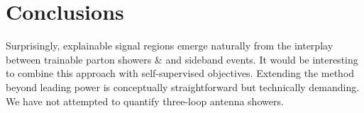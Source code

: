 \section{Conclusions}\label{sec:conclusions}

Surprisingly, explainable signal regions emerge naturally from the
interplay between trainable parton showers & and sideband events. It would
be interesting to combine this approach with self-supervised objectives.
Extending the method beyond leading power is conceptually
straightforward but technically demanding. We have not attempted to
quantify three-loop antenna showers.

